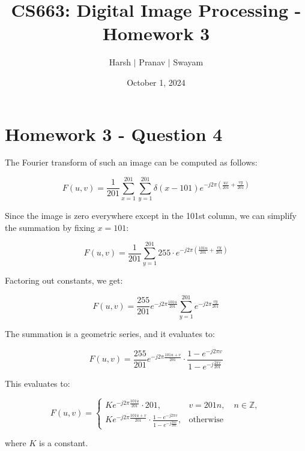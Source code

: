 \documentclass{article}
\title{CS663: Digital Image Processing - Homework 3}
\author{Harsh $\vert$ Pranav $\vert$ Swayam}
\date{October 1, 2024}
\begin{document}
\maketitle
\section{Homework 3 - Question 4}



The Fourier transform of such an image can be computed as follows:

\[
F(u,v) = \frac{1}{201} \sum_{x=1}^{201} \sum_{y=1}^{201} \delta(x - 101) e^{-j 2\pi \left( \frac{ux}{201} + \frac{vy}{201} \right)}
\]

Since the image is zero everywhere except in the 101st column, we can simplify the summation by fixing \( x = 101 \):

\[
F(u,v) = \frac{1}{201} \sum_{y=1}^{201} 255 \cdot e^{-j 2\pi \left( \frac{101u}{201} + \frac{vy}{201} \right)}
\]

Factoring out constants, we get:

\[
F(u,v) = \frac{255}{201} e^{-j 2\pi \frac{101u}{201}} \sum_{y=1}^{201} e^{-j 2\pi \frac{vy}{201}}
\]

The summation is a geometric series, and it evaluates to:

\[
F(u,v) = \frac{255}{201} e^{-j 2\pi \frac{101u + v}{201}} \cdot \frac{1 - e^{-j 2\pi v}}{1 - e^{-j \frac{2\pi v}{201}}}
\]

This evaluates to:

\[
F(u,v) = \begin{cases}
K e^{-j 2\pi \frac{101u}{201}} \cdot 201, & v = 201n, \quad n \in \mathbb{Z}, \\
K e^{-j 2\pi \frac{101u+v}{201}} \cdot \frac{1 - e^{-j 2\pi v}}{1 - e^{-j \frac{2\pi v}{201}}}, & \text{otherwise}
\end{cases}
\]

where \( K \) is a constant.
\end{document}
